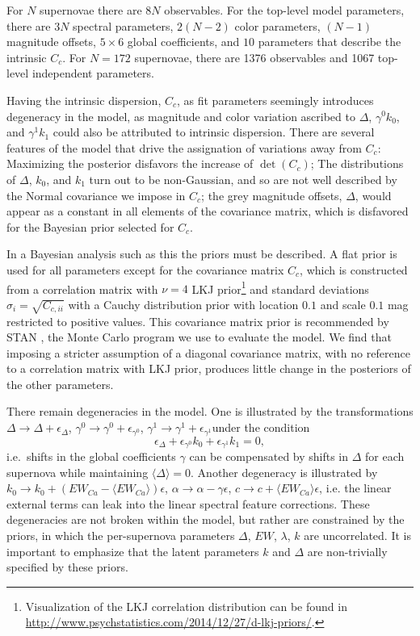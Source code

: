 \documentclass{aastex61}   	%
\begin{document}
For $N$ supernovae there are $8N$ observables.  For the top-level model parameters, there are $3N$ spectral parameters, $2(N-2)$
color parameters, $(N-1)$ magnitude offsets,  $5 \times 6$ global coefficients, and $10$ parameters that describe the intrinsic
$C_c$.  For $N=172$ supernovae, there are 1376 observables and 1067 top-level independent parameters.


Having the intrinsic dispersion, $C_c$, as fit parameters seemingly introduces degeneracy in the model, as magnitude and color variation
ascribed to $\Delta$, $\gamma^0 k_0$, and $\gamma^1 k_1$ could also be attributed to intrinsic dispersion.  There are several features of the model
that drive the assignation of variations away from $C_c$:  Maximizing the posterior disfavors the increase of $\det{(C_c)}$;
The distributions of $\Delta$, $k_0$, and $k_1$ turn out to
be non-Gaussian, and so are not well described by the Normal covariance we impose in $C_c$; the grey magnitude offsets, $\Delta$, would appear as a constant
in all elements of the covariance matrix, which is disfavored for the Bayesian prior selected for $C_c$.

In a Bayesian analysis such as this the priors must be described.  A flat prior is used for all parameters except
for the covariance matrix $C_c$, which is constructed from a correlation matrix with  $\nu=4$  LKJ prior\footnote{
Visualization of the LKJ correlation distribution can be found in \url{http://www.psychstatistics.com/2014/12/27/d-lkj-priors/}.}
\citep{Lewandowski20091989} and standard
deviations $\sigma_i = \sqrt{C_{c,ii}}$ with a  Cauchy distribution prior with location
 $0.1$ and scale $0.1$ mag restricted to positive values.
This covariance matrix prior is recommended by STAN \citep{stan}, the Monte Carlo program we use to evaluate the model.
 We find that imposing a stricter assumption of a
 diagonal covariance matrix, with no reference to a correlation matrix with LKJ prior, produces little change in the posteriors of
 the other parameters.

There remain degeneracies in the model.  One is illustrated by the  transformations $\Delta \rightarrow \Delta  + \epsilon_\Delta$,
 $\gamma^0 \rightarrow \gamma^0  + \epsilon_{\gamma^0}$, $\gamma^1 \rightarrow \gamma^1 + \epsilon_{\gamma^1}$under the condition
$$
\epsilon_\Delta  +  \epsilon_{\gamma^0} k_0+  \epsilon_{\gamma^1} k_1=0,
$$
i.e.\ shifts in the global coefficients $\gamma$ can be compensated by shifts in $\Delta$ for each supernova while maintaining 
$\langle \Delta \rangle=0$.
Another degeneracy is illustrated by $k_0 \rightarrow k_0 + (EW_{Ca}-\langle EW_{Ca}\rangle)\epsilon$,
$\alpha \rightarrow \alpha - \gamma \epsilon$, $c \rightarrow c + \langle EW_{Ca}\rangle \epsilon$, i.e. the
linear external terms can leak into the linear spectral feature corrections.
These degeneracies are not broken within the model, but rather are constrained by the priors, in which the
per-supernova parameters
$\Delta$, $EW$, $\lambda$, $k$ are uncorrelated.  It is important to emphasize that the latent parameters $k$ and $\Delta$
are non-trivially specified by these priors.
\end{document}
